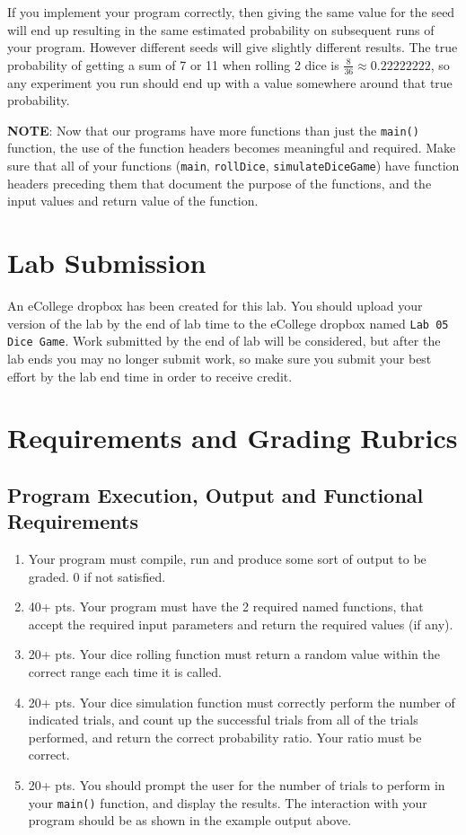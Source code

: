 \documentclass[11pt]{article}
\begin{document}
If you implement your program correctly, then giving the same value
for the seed will end up resulting in the same estimated probability
on subsequent runs of your program.  However different seeds will give
slightly different results.  The true probability of getting a sum of
7 or 11 when rolling 2 dice is $\frac{8}{36} \approx 0.22222222$, so
any experiment you run should end up with a value somewhere around
that true probability.

\textbf{NOTE}: Now that our programs have more functions than just the
\verb~main()~ function, the use of the function headers becomes meaningful
and required.  Make sure that all of your functions (\verb~main~,
\verb~rollDice~, \verb~simulateDiceGame~) have function headers preceding them
that document the purpose of the functions, and the input values and
return value of the function.
\section*{Lab Submission}
\label{sec-4}

An eCollege dropbox has been created for this lab.  You should
upload your version of the lab by the end of lab time to the eCollege
dropbox named \verb~Lab 05 Dice Game~.  Work submitted by the end
of lab will be considered, but after the lab ends you may no longer
submit work, so make sure you submit your best effort by the lab end
time in order to receive credit.
\section*{Requirements and Grading Rubrics}
\label{sec-5}

\subsection*{Program Execution, Output and Functional Requirements}
\label{sec-5-1}

\begin{enumerate}
\item Your program must compile, run and produce some sort of output to be
graded. 0 if not satisfied.
\item 40+ pts.  Your program must have the 2 required named functions,
that accept the required input parameters and return the required
values (if any).
\item 20+ pts. Your dice rolling function must return a random value within the
correct range each time it is called.
\item 20+ pts. Your dice simulation function must correctly perform the number of indicated
trials, and count up the successful trials from all of the trials performed,
and return the correct probability ratio.  Your ratio must be correct.
\item 20+ pts. You should prompt the user for the number of trials to
perform in your \verb~main()~ function, and display the results.  The
interaction with your program should be as shown in the example
output above.
\end{enumerate}
\end{document}
